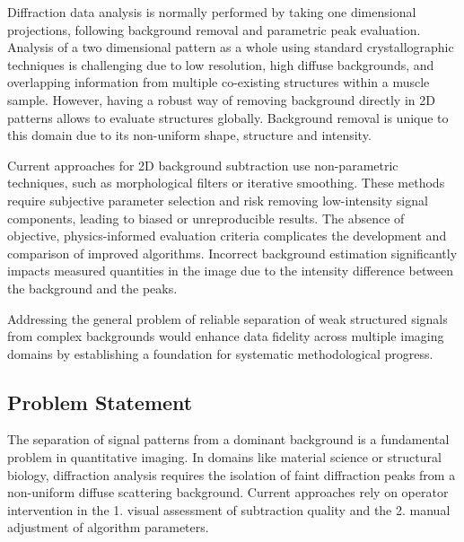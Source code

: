 \documentclass[iucr,review]{iucrjournals}
\begin{document}
Diffraction data analysis is normally performed by taking one dimensional projections, following background removal and parametric peak evaluation.
Analysis of a two dimensional pattern as a whole using standard crystallographic techniques is challenging due to low resolution, high diffuse backgrounds, and overlapping information from multiple co-existing structures within a muscle sample. 
However, having a robust way of removing background directly in 2D patterns allows to evaluate structures globally.
Background removal is unique to this domain due to its non-uniform shape, structure and intensity. 

Current approaches for 2D background subtraction use non-parametric techniques, such as morphological filters or iterative smoothing.
These methods require subjective parameter selection and risk removing low-intensity
signal components, leading to biased or unreproducible results.
The absence of objective, physics-informed evaluation criteria complicates the development and comparison of improved algorithms.
Incorrect background estimation significantly impacts measured quantities in the image due to the intensity difference between the background and the peaks.

Addressing the general problem of reliable separation of weak structured signals
from complex backgrounds would enhance data fidelity
across multiple imaging domains by establishing a
foundation for systematic methodological progress.

\subsection{Problem Statement}
The separation of signal patterns from a dominant background is a fundamental problem in quantitative imaging.
In domains like material science or structural biology, diffraction analysis
requires the isolation of faint diffraction peaks from a non-uniform diffuse scattering background. 
Current approaches rely on operator intervention in the 1. visual assessment of subtraction quality
and the 2. manual adjustment of algorithm parameters.
\end{document}
